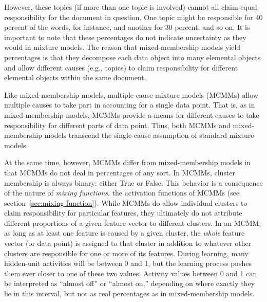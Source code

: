 However, these topics (if more than one topic is involved) cannot all claim equal responsibility
for the document in question. One topic might be responsible for 40 percent of the words, for instance, 
and another for 30 percent, and so on. 
It is important to note that these percentages 
do not indicate uncertainty as they would in mixture models. 
The reason that mixed-membership models yield percentages is 
that they decompose each data object into many elemental objects and allow different 
causes (e.g., topics) to claim responsibility for different 
elemental objects within the same document. 

Like mixed-membership models, multiple-cause mixture models (MCMMs) 
allow multiple causes to take part in accounting for a single data point. 
That is, as in mixed-membership models, MCMMs provide a means for 
different causes to take responsibility for different parts of data point. 
Thus, both MCMMs and mixed-membership models transcend the single-cause assumption of standard 
mixture models.

At the same time, however, MCMMs differ from mixed-membership models in that MCMMs do not deal in 
percentages of any sort.
In MCMMs, 
cluster membership is always binary: either True or False. %
This behavior is a consequence of the nature of \emph{mixing functions}, the activation functions of MCMMs (see section~\ref{sec:mixing-function}). 
While MCMMs do allow individual clusters to claim responsibility 
for particular features, they ultimately do not attribute different proportions of a given feature vector
to different clusters. In an MCMM, as long as at least one feature is caused by a given cluster, the \emph{whole} feature
vector (or data point) is assigned to that cluster in addition to whatever other clusters are responsible for one or more of its features. 
During learning, many hidden-unit activities will be between 0 and 1,
but the learning process pushes them ever closer to one of these two values. 
Activity values between 0 and 1 can be interpreted as ``almost off'' or ``almost on,'' depending on where exactly they lie in this interval,
but not as real percentages as in mixed-membership models. 

